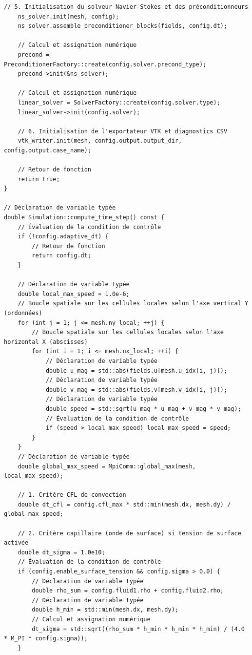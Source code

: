 \documentclass[10pt,a4paper,oneside]{book}
\begin{document}
\begin{lstlisting}[language={[11]C++}]
    // 5. Initialisation du solveur Navier-Stokes et des préconditionneurs
    ns_solver.init(mesh, config);
    ns_solver.assemble_preconditioner_blocks(fields, config.dt);

    // Calcul et assignation numérique
    precond = PreconditionerFactory::create(config.solver.precond_type);
    precond->init(&ns_solver);

    // Calcul et assignation numérique
    linear_solver = SolverFactory::create(config.solver.type);
    linear_solver->init(config.solver);

    // 6. Initialisation de l'exportateur VTK et diagnostics CSV
    vtk_writer.init(mesh, config.output.output_dir, config.output.case_name);

    // Retour de fonction
    return true;
}

// Déclaration de variable typée
double Simulation::compute_time_step() const {
    // Évaluation de la condition de contrôle
    if (!config.adaptive_dt) {
        // Retour de fonction
        return config.dt;
    }

    // Déclaration de variable typée
    double local_max_speed = 1.0e-6;
    // Boucle spatiale sur les cellules locales selon l'axe vertical Y (ordonnées)
    for (int j = 1; j <= mesh.ny_local; ++j) {
        // Boucle spatiale sur les cellules locales selon l'axe horizontal X (abscisses)
        for (int i = 1; i <= mesh.nx_local; ++i) {
            // Déclaration de variable typée
            double u_mag = std::abs(fields.u[mesh.u_idx(i, j)]);
            // Déclaration de variable typée
            double v_mag = std::abs(fields.v[mesh.v_idx(i, j)]);
            // Déclaration de variable typée
            double speed = std::sqrt(u_mag * u_mag + v_mag * v_mag);
            // Évaluation de la condition de contrôle
            if (speed > local_max_speed) local_max_speed = speed;
        }
    }
    // Déclaration de variable typée
    double global_max_speed = MpiComm::global_max(mesh, local_max_speed);

    // 1. Critère CFL de convection
    double dt_cfl = config.cfl_max * std::min(mesh.dx, mesh.dy) / global_max_speed;

    // 2. Critère capillaire (onde de surface) si tension de surface activée
    double dt_sigma = 1.0e10;
    // Évaluation de la condition de contrôle
    if (config.enable_surface_tension && config.sigma > 0.0) {
        // Déclaration de variable typée
        double rho_sum = config.fluid1.rho + config.fluid2.rho;
        // Déclaration de variable typée
        double h_min = std::min(mesh.dx, mesh.dy);
        // Calcul et assignation numérique
        dt_sigma = std::sqrt((rho_sum * h_min * h_min * h_min) / (4.0 * M_PI * config.sigma));
    }


\end{lstlisting}
\end{document}
